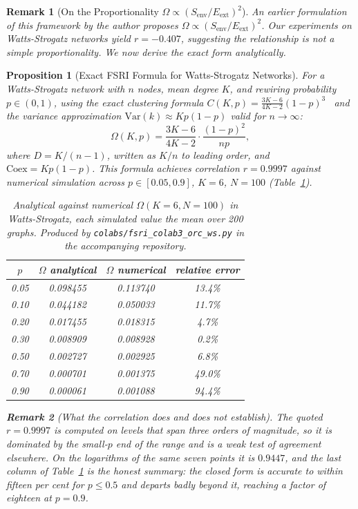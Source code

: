 \documentclass[11pt,a4paper]{article}
\newtheorem{proposition}{Proposition}
\newtheorem{remark}{Remark}
\begin{document}
\begin{remark}[On the Proportionality $\Omega \propto (S_\text{env}/E_\text{ext})^2$]
An earlier formulation of this framework by the author proposes
$\Omega \propto (S_\text{env}/E_\text{ext})^2$. Our experiments on Watts-Strogatz networks
yield $r = -0.407$, suggesting the relationship is not a simple proportionality.
We now derive the exact form analytically.
\end{remark}

\begin{proposition}[Exact FSRI Formula for Watts-Strogatz Networks]
\label{prop:ws_exact}
For a Watts-Strogatz network with $n$ nodes, mean degree $K$, and
rewiring probability $p \in (0,1)$, using the exact clustering formula
$C(K,p) = \frac{3K-6}{4K-2}(1-p)^3$~\cite{barrat2000} and the
variance approximation $\mathrm{Var}(k) \approx Kp(1-p)$ valid for
$n \to \infty$:
\begin{equation}
\Omega(K,p) = \frac{3K-6}{4K-2} \cdot \frac{(1-p)^2}{np},
\label{eq:omega_ws}
\end{equation}
where $D = K/(n-1)$, written as $K/n$ to leading order, and
$\mathrm{Coex} = Kp(1-p)$. This formula achieves
correlation $r = 0.9997$ against numerical simulation across
$p \in [0.05, 0.9]$, $K = 6$, $N = 100$ (Table~\ref{tab:ws_validation}).

\begin{table}[h]
\centering
\caption{Analytical against numerical $\Omega(K=6, N=100)$ in
Watts-Strogatz, each simulated value the mean over 200 graphs. Produced by
\texttt{colabs/fsri\_colab3\_orc\_ws.py} in the accompanying repository.}
\label{tab:ws_validation}
\begin{tabular}{cccc}
\toprule
$p$ & $\Omega$ analytical & $\Omega$ numerical & relative error \\
\midrule
0.05 & 0.098455 & 0.113740 & 13.4\% \\
0.10 & 0.044182 & 0.050033 & 11.7\% \\
0.20 & 0.017455 & 0.018315 & 4.7\% \\
0.30 & 0.008909 & 0.008928 & 0.2\% \\
0.50 & 0.002727 & 0.002925 & 6.8\% \\
0.70 & 0.000701 & 0.001375 & 49.0\% \\
0.90 & 0.000061 & 0.001088 & 94.4\% \\
\bottomrule
\end{tabular}
\end{table}

\begin{remark}[What the correlation does and does not establish]
\label{rem:ws_scope}
The quoted $r = 0.9997$ is computed on levels that span three orders of
magnitude, so it is dominated by the small-$p$ end of the range and is a
weak test of agreement elsewhere. On the logarithms of the same seven points
it is $0.9447$, and the last column of Table~\ref{tab:ws_validation} is the
honest summary: the closed form is accurate to within fifteen per cent for
$p \le 0.5$ and departs badly beyond it, reaching a factor of eighteen at
$p = 0.9$.


\end{remark}
\end{proposition}
\end{document}
